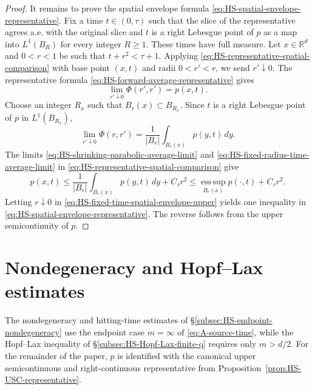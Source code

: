 \documentclass[11pt]{amsart}
\numberwithin{equation}{section}
\numberwithin{figure}{section}
\theoremstyle{plain}
\theoremstyle{definition}
\theoremstyle{remark}
\theoremstyle{plain}
\newcommand{\abs}[1]{\lvert #1 \rvert}
\def\R{\mathbb{R}}
\begin{document}
\begin{proof}
It remains to prove the spatial envelope formula
\eqref{eq:HS-spatial-envelope-representative}.  Fix a time
\(t\in(0,\tau)\) such that the slice of the representative agrees a.e. with
the original slice and \(t\) is a right Lebesgue point of \(p\) as a map into
\(L^1(B_R)\) for every integer \(R\geq1\).  These times have full measure.
Let \(x\in\R^d\) and \(0<r<1\) be such that \(t+r^2<\tau+1\).  Applying
\eqref{eq:HS-representative-spatial-comparison} with base point \((x,t)\)
and radii \(0<r'<r\), we send \(r'\downarrow0\).  The representative formula
\eqref{eq:HS-forward-average-representative} gives
\begin{equation}\label{eq:HS-shrinking-parabolic-average-limit}
    \lim_{r'\downarrow0}\Phi(r',r')=p(x,t).
\end{equation}
Choose an integer \(R_x\) such that \(B_r(x)\subset B_{R_x}\).  Since \(t\)
is a right Lebesgue point of \(p\) in \(L^1(B_{R_x})\),
\begin{equation}\label{eq:HS-fixed-radius-time-average-limit}
    \lim_{r'\downarrow0}\Phi(r,r')
    =
    \frac1{\abs{B_r}}\int_{B_r(x)}p(y,t)\,dy .
\end{equation}
The limits \eqref{eq:HS-shrinking-parabolic-average-limit} and
\eqref{eq:HS-fixed-radius-time-average-limit} in
\eqref{eq:HS-representative-spatial-comparison} give
\begin{equation}\label{eq:HS-fixed-time-spatial-envelope-upper}
    p(x,t)
    \leq
    \frac1{\abs{B_r}}\int_{B_r(x)}p(y,t)\,dy+C_\tau r^2
    \leq
    \operatorname*{ess\,sup}_{B_r(x)}p(\cdot,t)+C_\tau r^2 .
\end{equation}
Letting \(r\downarrow0\) in
\eqref{eq:HS-fixed-time-spatial-envelope-upper} yields one inequality in
\eqref{eq:HS-spatial-envelope-representative}.  The reverse follows from the
upper semicontinuity of \(p\).
\end{proof}

\section{Nondegeneracy and Hopf--Lax estimates}\label{sec:HS-nondegeneracy-hopf-lax}
The nondegeneracy and hitting-time
estimates of \S\ref{subsec:HS-endpoint-nondegeneracy} use the endpoint case \(m=\infty\) of
\eqref{eq:A-source-time}, while the Hopf--Lax inequality of
\S\ref{subsec:HS-Hopf-Lax-finite-q} requires only \(m>d/2\).
For the remainder of the paper, \(p\) is
identified with the canonical upper semicontinuous and right-continuous
representative from Proposition~\ref{prop:HS-USC-representative}.
\end{document}
